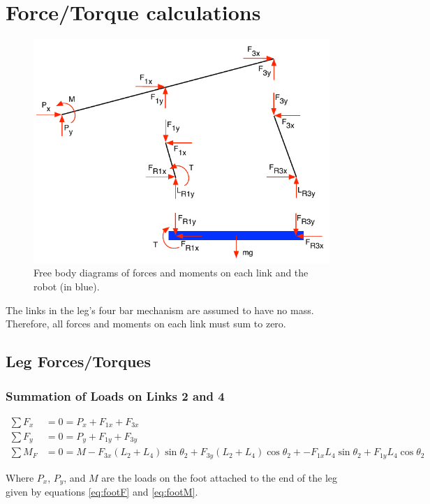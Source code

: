 \documentclass[letterpaper]{article}
\begin{document}
\section{Force/Torque calculations}

\begin{figure}[htb]
	\centering
	\includegraphics{FB.pdf}
	\caption{Free body diagrams of forces and moments on each link and the robot (in blue).}
	\label{fig:FB}
\end{figure}

The links in the leg's four bar mechanism are assumed to have no mass. Therefore, all forces and moments on each link must sum to zero.
\subsection{Leg Forces/Torques}
\subsubsection{Summation of Loads on Links 2 and 4}

\begin{align}
	\sum F_x &= 0 = P_x + F_{1x} + F_{3x} \\
	\sum F_y &= 0 = P_y + F_{1y} + F_{3y} \\
	\sum M_F &= 0 = M - F_{3x} (L_2 + L_4) \sin \theta_2 + F_{3y} (L_2 + L_4) \cos \theta_2 + - F_{1x} L_4 \sin \theta_2 + F_{1y} L_4 \cos \theta_2
\end{align}

\noindent Where $P_x$, $P_y$, and $M$ are the loads on the foot attached to the end of the leg given by equations \ref{eq:footF} and \ref{eq:footM}.
\end{document}
